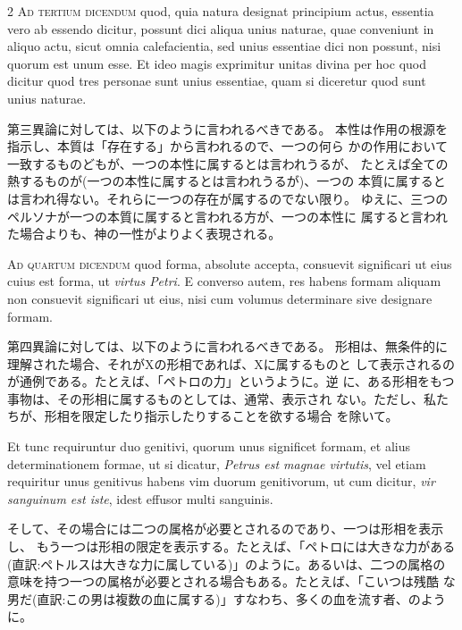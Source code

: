 \documentclass[paper=a4paper,fontsize=10pt,jafontsize=9pt,titlepage]{jlreq}
\begin{document}
\begin{paracol}{2}
{\scshape Ad tertium dicendum} quod, quia natura designat principium actus,
essentia vero ab essendo dicitur, possunt dici aliqua unius naturae,
quae conveniunt in aliquo actu, sicut omnia calefacientia, sed unius
essentiae dici non possunt, nisi quorum est unum esse. Et ideo magis
exprimitur unitas divina per hoc quod dicitur quod tres personae sunt
unius essentiae, quam si diceretur quod sunt unius naturae.

\switchcolumn

第三異論に対しては、以下のように言われるべきである。
本性は作用の根源を指示し、本質は「存在する」から言われるので、一つの何ら
 かの作用において一致するものどもが、一つの本性に属するとは言われうるが、
 たとえば全ての熱するものが(一つの本性に属するとは言われうるが)、一つの
 本質に属するとは言われ得ない。それらに一つの存在が属するのでない限り。
 ゆえに、三つのペルソナが一つの本質に属すると言われる方が、一つの本性に
 属すると言われた場合よりも、神の一性がよりよく表現される。

\switchcolumn*

{\scshape Ad quartum dicendum} quod forma, absolute accepta, consuevit significari
ut eius cuius est forma, ut {\itshape virtus Petri}. E converso autem, res habens
formam aliquam non consuevit significari ut eius, nisi cum volumus
determinare sive designare formam.

\switchcolumn

第四異論に対しては、以下のように言われるべきである。
形相は、無条件的に理解された場合、それがXの形相であれば、Xに属するものと
 して表示されるのが通例である。たとえば、「ペトロの力」というように。逆
 に、ある形相をもつ事物は、その形相に属するものとしては、通常、表示され
 ない。ただし、私たちが、形相を限定したり指示したりすることを欲する場合
 を除いて。

\switchcolumn*

Et tunc requiruntur duo genitivi,
quorum unus significet formam, et alius determinationem formae, ut si
dicatur, {\itshape Petrus est magnae virtutis}, vel etiam requiritur unus genitivus
habens vim duorum genitivorum, ut cum dicitur, {\itshape vir sanguinum est iste},
idest effusor multi sanguinis.

\switchcolumn

そして、その場合には二つの属格が必要とされるのであり、一つは形相を表示し、
 もう一つは形相の限定を表示する。たとえば、「ペトロには大きな力がある
 (直訳:ペトルスは大きな力に属している)」のように。あるいは、二つの属格の
 意味を持つ一つの属格が必要とされる場合もある。たとえば、「こいつは残酷
 な男だ(直訳:この男は複数の血に属する)」すなわち、多くの血を流す者、のように。


\end{paracol}
\end{document}
